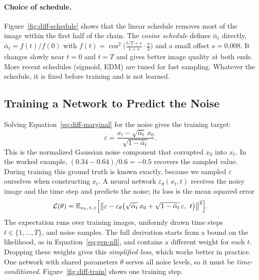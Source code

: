 \paragraph{Choice of schedule.}
Figure~\ref{fig:diff-schedule} shows that the linear schedule removes most of
the image within the first half of the chain. The \emph{cosine schedule}
defines $\bar\alpha_t$ directly,
$\bar\alpha_t = f(t)/f(0)$ with $f(t)=\cos^2\!\bigl(\tfrac{t/T+s}{1+s}
\cdot\tfrac{\pi}{2}\bigr)$ and a small offset $s=0.008$. It changes slowly near
$t=0$ and $t=T$ and gives better image quality at both ends. More recent
schedules (sigmoid, EDM) are tuned for fast sampling. Whatever the schedule,
it is fixed before training and is not learned.

\subsection{Training a Network to Predict the Noise}

Solving Equation~\ref{eq:diff-marginal} for the noise gives the training
target:
\begin{equation}
  \varepsilon = \frac{x_t-\sqrt{\bar\alpha_t}\,x_0}{\sqrt{1-\bar\alpha_t}} .
  \label{eq:diff-eps-target}
\end{equation}
\noindent
This is the normalized Gaussian noise component that corrupted $x_0$ into
$x_t$. In the worked example, $(0.34-0.64)/0.6=-0.5$ recovers the sampled
value. During training this ground truth is known exactly, because we sampled
$\varepsilon$ ourselves when constructing $x_t$. A neural network
$\varepsilon_\theta(x_t,t)$ receives the noisy image and the time step and
predicts the noise; its loss is the mean squared error
\begin{equation}
  \mathcal L(\theta) = \mathbb E_{x_0,\,t,\,\varepsilon}\Bigl[
  \bigl\|\varepsilon-\varepsilon_\theta\bigl(\sqrt{\bar\alpha_t}\,x_0
  +\sqrt{1-\bar\alpha_t}\,\varepsilon,\ t\bigr)\bigr\|^2\Bigr].
  \label{eq:diff-loss}
\end{equation}
\noindent
The expectation runs over training images, uniformly drawn time steps
$t\in\{1,\dots,T\}$, and noise samples. The full derivation starts from a
bound on the likelihood, as in Equation~\ref{eq:gen-nll}, and contains a
different weight for each $t$. Dropping these weights gives this
\emph{simplified loss}, which works better in practice. One network with
shared parameters $\theta$ serves all noise levels, so it must be
\emph{time-conditioned}. Figure~\ref{fig:diff-train} shows one training step.


